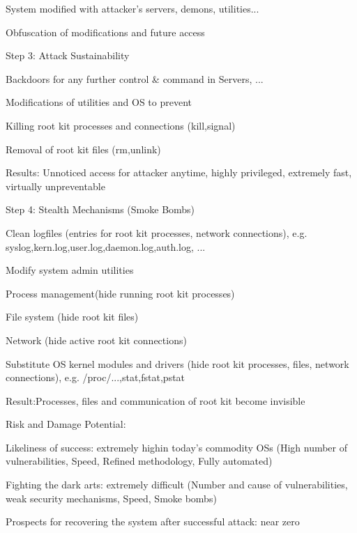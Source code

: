 \documentclass[a4paper]{article}
\begin{document}
\begin{multicols}{3}
\begin{itemize*}
\begin{itemize*}
            \item System modified with attacker’s servers, demons, utilities...
            \item Obfuscation of modifications and future access
        \end{itemize*}
    \end{itemize*}
    Step 3: Attack Sustainability
    \begin{itemize*}
        \item Backdoors for any further control \& command in Servers, ...
        \item Modifications of utilities and OS to prevent
        \begin{itemize*}
            \item Killing root kit processes and connections (kill,signal)
            \item Removal of root kit files (rm,unlink)
        \end{itemize*}
        \item Results: Unnoticed access for attacker anytime, highly privileged, extremely fast, virtually unpreventable
    \end{itemize*}
    Step 4: Stealth Mechanisms (Smoke Bombs)
    \begin{itemize*}
        \item Clean logfiles (entries for root kit processes, network connections), e.g. syslog,kern.log,user.log,daemon.log,auth.log, ...
        \item Modify system admin utilities
        \begin{itemize*}
            \item Process management(hide running root kit processes)
            \item File system (hide root kit files)
            \item Network (hide active root kit connections)
        \end{itemize*}
        \item Substitute OS kernel modules and drivers (hide root kit processes, files, network connections), e.g. /proc/...,stat,fstat,pstat
        \item Result:Processes, files and communication of root kit become invisible
    \end{itemize*}

    Risk and Damage Potential:
    \begin{itemize*}
        \item Likeliness of success: extremely highin today’s commodity OSs (High number of vulnerabilities, Speed, Refined methodology, Fully automated)
        \item Fighting the dark arts: extremely difficult (Number and cause of vulnerabilities, weak security mechanisms, Speed, Smoke bombs)
        \item Prospects for recovering the system after successful attack: near zero
    \end{itemize*}


\end{multicols}
\end{document}
